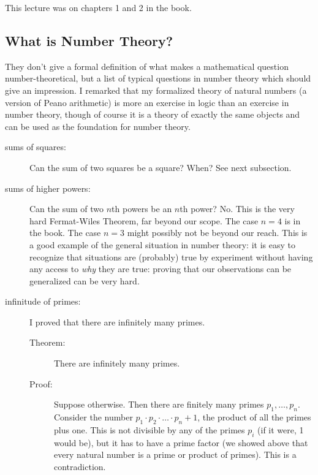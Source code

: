 \documentclass[12pt]{article}
\begin{document}
This lecture was on chapters 1 and 2 in the book.

\subsection{What is Number Theory?}

They don't give a formal definition of what makes a mathematical question number-theoretical, but a list of typical questions in number theory which should give an impression.   I remarked that my formalized theory of natural numbers (a version of Peano arithmetic) is more an exercise in logic than an exercise in number theory, though of course it is a theory of exactly the same objects and can be used as the foundation for number theory.

\begin{description}

\item[sums of squares:]  Can the sum of two squares be a square?   When?   See next subsection.

\item[sums of higher powers:]  Can the sum of two $n$th powers be an $n$th power?  No.   This is the very hard Fermat-Wiles Theorem, far beyond our scope.   The case $n=4$ is in the book.   The case $n=3$ might possibly not be beyond our reach.  This is a good example of the general situation in number theory:  it is easy to recognize that situations are (probably) true by experiment without having any access to {\em why\/} they are true:  proving that our observations can be generalized can be very hard.

\item[infinitude of primes:]  I proved that there are infinitely many primes.

\begin{description}

\item[Theorem:]  There are infinitely many primes.

\item[Proof:]  Suppose otherwise.   Then there are finitely many primes $p_1,\ldots,p_n$.   Consider the number $p_1\cdot p_2 \cdot \ldots \cdot p_n+1$, the product of all the primes plus one.   This is not divisible by any of the primes $p_i$ (if it were, 
1 would be), but it has to have a prime factor (we showed above that every natural number is a prime or product of primes).   This is a contradiction.

\end{description}


\end{description}
\end{document}
